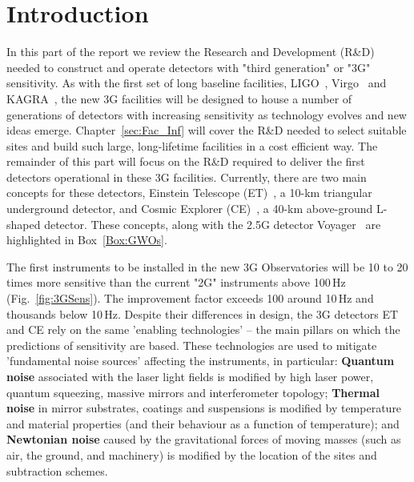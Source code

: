 \chapter{Introduction}
\label{sec:Intro}
\setcounter{page}{1}
\vspace{-1.5cm}
In this part of the report we review the Research and Development (R\&D) needed to construct and operate detectors with "third generation" or "3G" sensitivity. As with the first set of long baseline facilities, LIGO~\cite{AdvancedLIGO2015}, Virgo~\cite{AdvancedVirgo2015} and KAGRA~\cite{KAGRA2013}, the new 3G facilities will be designed to house a number of generations of detectors with increasing sensitivity as technology evolves and new ideas emerge. Chapter~\ref{sec:Fac_Inf} will cover the R\&D needed to select suitable sites and build such large, long-lifetime facilities in a cost efficient way. The remainder of this part will focus on the R\&D required to deliver the first detectors operational in these 3G facilities.  Currently, there are two main concepts for these detectors, Einstein Telescope (ET)~\cite{ET2011}, a 10-km triangular underground detector, and Cosmic Explorer (CE)~\cite{CosmicExplorer2017}, a 40-km above-ground L-shaped detector. These concepts, along with the 2.5G detector Voyager~\cite{Voyager:Inst,VoyagerDCC2018} are highlighted in Box~\ref{Box:GWOs}.

The first instruments to be installed in the new 3G Observatories will be 10 to 20 times more sensitive than the current 
"2G" instruments above 100\,Hz (Fig.~\ref{fig:3GSens}).  The improvement factor exceeds 100 around 10\,Hz and thousands below 10\,Hz. Despite their differences in design, the 3G detectors ET and CE rely on the same 'enabling technologies' -- the main pillars on which the predictions of sensitivity are based. These technologies are used to mitigate 'fundamental noise sources' affecting the instruments, in particular: \textbf{Quantum noise} associated with the laser light fields is modified by high laser power, quantum squeezing, massive mirrors and interferometer topology; \textbf{Thermal noise} in mirror substrates, coatings and suspensions is modified by temperature and material properties (and their behaviour as a function of temperature); and \textbf{Newtonian noise} caused by the gravitational forces of moving masses (such as air, the ground, and machinery) is modified by the location of the sites and subtraction schemes. 
   
